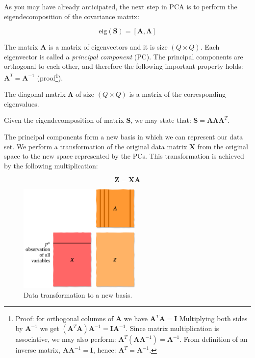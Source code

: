 \documentclass[10pt,twocolumn]{article}
\begin{document}
As you may have already anticipated, the next step in PCA is to perform the eigendecomposition of the covariance matrix:

\begin{equation} \label{eq:eig-dec}
\text{eig}(\bm{S}) = [\bm{A}, \bm{\Lambda}]
\end{equation}

The matrix $\bm{A}$ is a matrix of eigenvectors and it is size $(Q \times Q)$. Each eigenvector is called a \textit{principal component} (PC). The principal components are orthogonal to each other, and therefore the following important property holds: $\bm{A}^T = \bm{A}^{-1}$ (proof\footnote{Proof: for orthogonal columns of $\bm{A}$ we have $\bm{A}^T \bm{A} = \bm{I}$ Multiplying both sides by $\bm{A}^{-1}$ we get $(\bm{A}^T \bm{A}) \bm{A}^{-1}= \bm{I}\bm{A}^{-1}$. Since matrix multiplication is associative, we may also perform: $\bm{A}^T (\bm{A} \bm{A}^{-1}) = \bm{A}^{-1}$. From definition of an inverse matrix,  $\bm{A} \bm{A}^{-1} = \bm{I}$, hence: $\bm{A}^T = \bm{A}^{-1}$.}).

The diagonal matrix $\bm{\Lambda}$ of size $(Q \times Q)$ is a matrix of the corresponding eigenvalues.

Given the eigendecomposition of matrix $\bm{S}$, we may state that: $\bm{S} = \bm{A} \bm{\Lambda} \bm{A}^T$.

The principal components form a new basis in which we can represent our data set. We perform a transformation of the original data matrix $\bm{X}$ from the original space to the new space represented by the PCs. This transformation is achieved by the following multiplication:

\begin{equation} \label{eq:data-transform}
\bm{Z} = \bm{X} \bm{A}
\end{equation}

\begin{figure}[H]
\centering\includegraphics[width=6cm]{data-transformation.png}
\caption{Data transformation to a new basis.}
\label{fig:data-transformation}
\end{figure}
\end{document}
